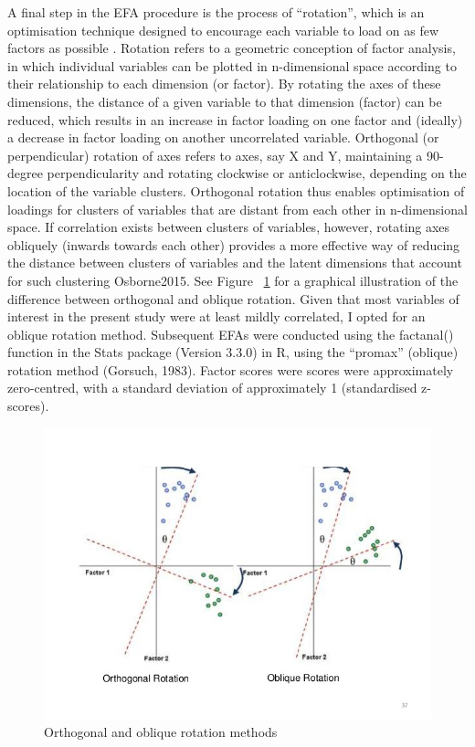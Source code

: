 \documentclass[12pt]{report}
\begin{document}
{A final step in the EFA procedure is the process of ``rotation'', which is an optimisation technique designed to encourage each variable to load on as few factors as possible \citep{Rummel1988}. Rotation refers to a geometric conception of factor analysis, in which individual variables can be plotted in n-dimensional space according to their relationship to each dimension (or factor). By rotating the axes of these dimensions, the distance of a given variable to that dimension (factor) can be reduced, which results in an increase in factor loading on one factor and (ideally) a decrease in factor loading on another uncorrelated variable. Orthogonal (or perpendicular) rotation of axes refers to axes, say X and Y, maintaining a 90-degree perpendicularity and rotating clockwise or anticlockwise, depending on the location of the variable clusters. Orthogonal rotation thus enables optimisation of loadings for clusters of variables that are distant from each other in n-dimensional space. If correlation exists between clusters of variables, however, rotating axes obliquely (inwards towards each other) provides a more effective way of reducing the distance between clusters of variables and the latent dimensions that account for such clustering Osborne2015. See Figure ~\ref{fig:orthogonalOblique} for a graphical  illustration of the difference between orthogonal and oblique rotation. Given that most variables of interest in the present study were at least mildly correlated, I opted for an oblique rotation method. Subsequent EFAs were conducted using the factanal() function in the Stats package (Version 3.3.0) in R, using the ``promax'' (oblique) rotation method (Gorsuch, 1983). Factor scores were scores were approximately zero-centred, with a standard deviation of approximately 1 (standardised z-scores).

\begin{figure}[htbp]
  \begin{center}
    \includegraphics[width= \linewidth, scale = .5]{../images/orthogonalObliqueRotationExample.jpg}
    \caption{Orthogonal and oblique rotation methods}
    \label{fig:orthogonalOblique}
  \end{center}
\end{figure}

}
\end{document}
